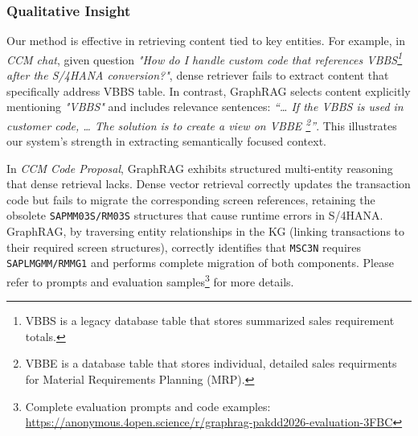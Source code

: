 \documentclass[runningheads]{llncs}
\begin{document}
\begin{table}[H]
  \caption{LLM-as-a-Judge on CCM Code Proposal (Dependency Graph-based)}
  \label{tab:ccm_code_dependency}
  \centering
  {\footnotesize
  }
\end{table}

\FloatBarrier  %
\endgroup

\subsubsection{Qualitative Insight} Our method is effective in retrieving content tied to key entities. For example, in \textit{CCM chat}, given question \textit{"How do I handle custom code that references \textit{VBBS}\footnote{VBBS is a legacy database table that stores summarized sales requirement totals.} after the S/4HANA conversion?"}, dense retriever fails to extract content that specifically address VBBS table. In contrast, GraphRAG selects content explicitly mentioning \textit{"VBBS"} and includes relevance sentences: \textit{“… If the VBBS is used in customer code, … The solution is to create a view on VBBE \footnote{VBBE is a database table that stores individual, detailed sales requirments for Material Requirements Planning (MRP).}”}. This illustrates our system's strength in extracting semantically focused context.

In \textit{CCM Code Proposal}, GraphRAG exhibits structured multi-entity reasoning that dense retrieval lacks. Dense vector retrieval correctly updates the transaction code but fails to migrate the corresponding screen references, retaining the obsolete \texttt{SAPMM03S/RM03S} structures that cause runtime errors in S/4HANA. GraphRAG, by traversing entity relationships in the KG (linking transactions to their required screen structures), correctly identifies that \texttt{MSC3N} requires \texttt{SAPLMGMM/RMMG1} and performs complete migration of both components. Please refer to prompts and evaluation samples\footnote{Complete evaluation prompts and code examples: \url{https://anonymous.4open.science/r/graphrag-pakdd2026-evaluation-3FBC}} for more details. 
\end{document}
